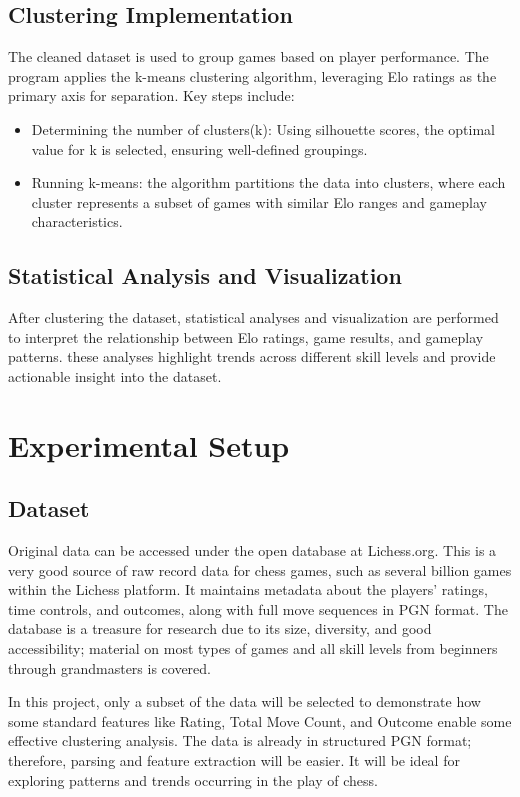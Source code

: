 \documentclass[conference]{IEEEtran}
\begin{document}
\subsection{Clustering Implementation}
 The cleaned dataset is used to group games based on player performance. The program applies the k-means clustering algorithm, leveraging Elo ratings as the primary axis for separation. Key steps include:
\begin{itemize}
    \item Determining the number of clusters(k): Using silhouette scores, the optimal value for k is selected, ensuring well-defined groupings.
    \item Running k-means: the algorithm partitions the data into clusters, where each cluster represents a subset of games with similar Elo ranges and gameplay characteristics.
\end{itemize}

\subsection{Statistical Analysis and Visualization}
After clustering the dataset, statistical analyses and visualization are performed to interpret the relationship between Elo ratings, game results, and gameplay patterns. these analyses highlight trends across different skill levels and provide actionable insight into the dataset.


\section{Experimental Setup}
\subsection{Dataset}
Original data can be accessed under the open database at Lichess.org. This is a very good source of raw record data for chess games, such as several billion games within the Lichess platform. It maintains metadata about the players' ratings, time controls, and outcomes, along with full move sequences in PGN format. The database is a treasure for research due to its size, diversity, and good accessibility; material on most types of games and all skill levels from beginners through grandmasters is covered.

In this project, only a subset of the data will be selected to demonstrate how some standard features like Rating, Total Move Count, and Outcome enable some effective clustering analysis. The data is already in structured PGN format; therefore, parsing and feature extraction will be easier. It will be ideal for exploring patterns and trends occurring in the play of chess.
\end{document}
